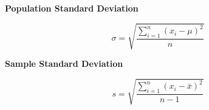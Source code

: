 \documentclass[
  letterpaper,
  DIV=11,
  numbers=noendperiod]{scrartcl}
\begin{document}
\begin{multicols}{2}

\begin{center}

\textbf{Population Standard Deviation}

$$
\sigma=\sqrt{\frac{\sum_{i=1}^n (x_i-\mu)^2}{n}}
$$

\end{center}

\columnbreak

\begin{center}

\textbf{Sample Standard Deviation}

$$
s=\sqrt{\frac{\sum_{i=1}^n (x_i-\bar{x})^2}{n-1}}
$$

\end{center}

\end{multicols}
\end{document}
